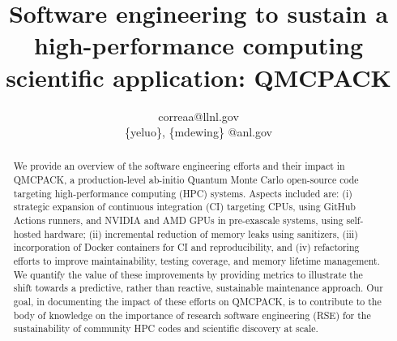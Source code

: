 \documentclass[conference]{IEEEtran}
\begin{document}
\title{Software engineering to sustain a high-performance computing scientific application: QMCPACK}

\author{

correaa@llnl.gov

\{yeluo\}, \{mdewing\} @anl.gov
}

\maketitle

\begin{abstract}
We provide an overview of the software engineering efforts and their impact in QMCPACK, a production-level ab-initio Quantum Monte Carlo open-source code targeting high-performance computing (HPC) systems. Aspects included are: (i) strategic expansion of continuous integration (CI) targeting CPUs, using GitHub Actions runners, and NVIDIA and AMD GPUs in pre-exascale systems, using self-hosted hardware; (ii) incremental reduction of memory leaks using sanitizers, (iii) incorporation of Docker containers for CI and reproducibility, and (iv) refactoring efforts to improve maintainability, testing coverage, and memory lifetime management. We quantify the value of these improvements by providing metrics to illustrate the shift towards a
predictive, rather than reactive, sustainable maintenance approach. Our goal, in documenting the impact of these efforts on QMCPACK, is to contribute to the body of knowledge on the importance of research software engineering (RSE) for the sustainability of community HPC codes and scientific discovery at scale.
\end{abstract}
\end{document}
